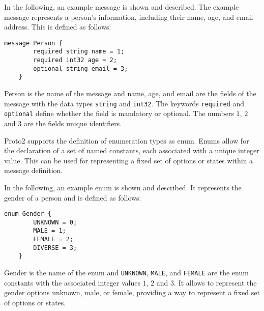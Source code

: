 \documentclass[../MasterThesis.tex]{subfiles}
\begin{document}
\begin{description}[font=\normalfont\color{RedViolet!80!black}, style=nextline]
In the following, an example message is shown and described.
The example message represents a person's information, including their name, age, and email address. This is defined as follows:

\begin{lstlisting}[style=protobufStyle, numbers=none]
	message Person {
		required string name = 1;
		required int32 age = 2;
		optional string email = 3;
	}
\end{lstlisting}

Person is the name of the message and name, age, and email are the fields of the message with the data types \texttt{string} and \texttt{int32}.
The keywords \texttt{required} and \texttt{optional} define whether the field is mandatory or optional.
The numbers $1$, $2$ and $3$ are the fields unique identifiers.


\item[Enums] 

Proto2 supports the definition of enumeration types as enum.
Enums allow for the declaration of a set of named constants, each associated with a unique integer value.
This can be used for representing a fixed set of options or states within a message definition.~\cite{protobuffer, proto2_doc}

In the following, an example enum is shown and described. 
It represents the gender of a person and is defined as follows:

\begin{lstlisting}[style=protobufStyle, numbers=none]
	enum Gender {
		UNKNOWN = 0;
		MALE = 1;
		FEMALE = 2;
		DIVERSE = 3;
	}
\end{lstlisting}

Gender is the name of the enum and \texttt{UNKNOWN}, \texttt{MALE}, and \texttt{FEMALE} are the enum constants with the associated integer values $1$, $2$ and $3$.
It allows to represent the gender options unknown, male, or female, providing a way to represent a fixed set of options or states.



\end{description}


	
\end{document}
